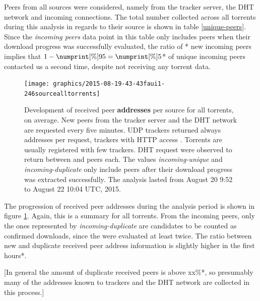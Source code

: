 \documentclass[10pt, a4paper, twoside, headsepline]{scrbook}
\renewcommand{\_}{\origunderscore\allowbreak}
\newcommand{\range}{from August 20 9:52 to August 22 10:04 UTC, 2015} %
\begin{document}
Peers from all sources were considered, namely from the tracker server, the DHT network and incoming connections. The total number collected across all torrents during this analysis in regards to their source is shown in table \ref{unique-peers}. Since the \emph{incoming peers} data point in this table only includes peers when their download progress was successfully evaluated, the ratio of * new incoming peers implies that $1-\numprint[\%]{95}=\numprint[\%]{5}$* of unique incoming peers contacted us a second time, despite not receiving any torrent data.

\begin{figure}
\centering
\texttt{[image: graphics/2015-08-19\_20-43-43\_faui1-246\_source\_all\_torrents]}
\caption[Development of received peer addresses per source]{Development of received peer \textbf{addresses} per source for all torrents, on average. New peers from the tracker server and the DHT network are requested every five minutes. UDP trackers returned always  addresses per request, trackers with HTTP access . Torrents are usually registered with few trackers. DHT request were observed to return between  and  peers each. The values \emph{incoming-unique} and \emph{incoming-duplicate} only include peers after their download progress was extracted successfully. The analysis lasted \range.}
\label{request-history}
\end{figure}

The progression of received peer addresses during the analysis period is shown in figure \ref{request-history}. Again, this is a summary for all torrents. From the incoming peers, only the ones represented by \emph{incoming-duplicate} are candidates to be counted as confirmed downloads, since the were evaluated at least twice. The ratio between new and duplicate received peer address information is slightly higher in the first hours*.

[In general the amount of duplicate received peers is above xx\%*, so presumably many of the addresses known to trackers and the DHT network are collected in this process.]
\end{document}
